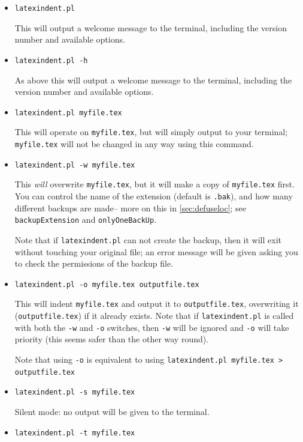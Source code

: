 \documentclass[11pt]{article}
\newcommand{\verbitem}[1]{\small\ttfamily{#1}}
\begin{document}
\begin{itemize}[labelsep=.5cm]
	\item[] \lstinline!latexindent.pl!

		This will output a welcome message to the terminal, including the version number
		and available options.
	\item[\verbitem{-h}] \lstinline!latexindent.pl -h!

		As above this will output a welcome message to the terminal, including the version number
		and available options.
	\item[] \lstinline!latexindent.pl myfile.tex!

		This will operate on \lstinline!myfile.tex!, but will simply output to your terminal; \lstinline!myfile.tex! will	not be changed in any way using this command.
	\item[\verbitem{-w}] \lstinline!latexindent.pl -w myfile.tex!

		This \emph{will} overwrite \lstinline!myfile.tex!, but it will
		make a copy of \lstinline!myfile.tex! first. You can control the name of
		the extension (default is \lstinline!.bak!), and how many different backups are made--
		more on this in \cref{sec:defuseloc}; see \lstinline!backupExtension! and \lstinline!onlyOneBackUp!.

		Note that if \lstinline!latexindent.pl! can not create the backup, then it
		will exit without touching your original file; an error message will be given
		asking you to check the permissions of the backup file.
	\item[\verbitem{-o}] \lstinline!latexindent.pl -o myfile.tex outputfile.tex!

		This will indent \lstinline!myfile.tex! and output it to \lstinline!outputfile.tex!,
		overwriting it (\lstinline!outputfile.tex!) if it already exists. Note that if \lstinline!latexindent.pl! is called with both
		the \lstinline!-w! and \lstinline!-o! switches, then \lstinline!-w! will
		be ignored and \lstinline!-o! will take priority (this seems safer than the
		other way round).

		Note that using \lstinline!-o! is equivalent to using \lstinline!latexindent.pl myfile.tex > outputfile.tex!
	\item[\verbitem{-s}] \lstinline!latexindent.pl -s myfile.tex!

		Silent mode: no output will be given to the terminal.
	\item[\verbitem{-t}] \lstinline!latexindent.pl -t myfile.tex!


\end{itemize}
\end{document}
